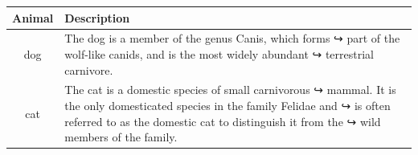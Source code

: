 \documentclass{article}
\begin{document}
\begin{tabular}{cp{9cm}}
\toprule
Animal & Description \\
\midrule
dog & The dog is a member of the genus Canis, which forms
↪ part of the
wolf-like canids, and is the most widely abundant
↪ terrestrial
carnivore. \\
\addlinespace
cat & The cat is a domestic species of small carnivorous
↪ mammal. It is the
only domesticated species in the family Felidae and
↪ is often referred
to as the domestic cat to distinguish it from the
↪ wild members of the
family. \\
\bottomrule
\end{tabular}
\end{document}
